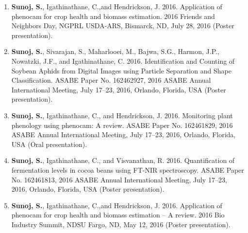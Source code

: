 \documentclass[11pt]{article}
\begin{document}
\begin{enumerate}[itemsep=-2pt]
\item \textbf{Sunoj, S.}, Igathinathane, C.,and Hendrickson, J. 2016. Application of phenocam for crop health and biomass estimation. 2016 Friends and Neighbors Day, NGPRL USDA-ARS, Bismarck, ND, July 28, 2016 (Poster presentation).

\item \textbf{Sunoj, S.}, Sivarajan, S., Maharlooei, M., Bajwa, S.G., Harmon, J.P., Nowatzki, J.F., and Igathinathane, C. 2016. Identification and Counting of Soybean Aphids from Digital Images using Particle Separation and Shape Classification. ASABE Paper No. 162462927, 2016 ASABE Annual International Meeting, July 17--23, 2016, Orlando, Florida, USA (Poster presentation). 

\item \textbf{Sunoj, S.}, Igathinathane, C., and Hendrickson, J. 2016. Monitoring plant phenology using phenocam: A review. ASABE Paper No. 162461829, 2016 ASABE Annual International Meeting, July 17--23, 2016, Orlando, Florida, USA (Oral presentation).

\item \textbf{Sunoj, S.}, Igathinathane, C., and Visvanathan, R. 2016. Quantification of fermentation levels in cocoa beans using FT-NIR spectroscopy. ASABE Paper No. 162461813, 2016 ASABE Annual International Meeting, July 17--23, 2016, Orlando, Florida, USA (Poster presentation).

\item \textbf{Sunoj, S.}, Igathinathane, C.,and Hendrickson, J. 2016. Application of phenocam for crop health and biomass estimation -- A review. 2016 Bio Industry Summit, NDSU Fargo, ND, May 12, 2016 (Poster presentation).

\end{enumerate}

\end{document}
